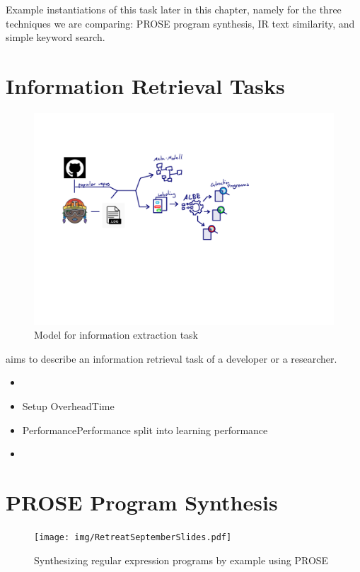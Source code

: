 \documentclass[\myrootdir/main.tex]{subfiles}
\begin{document}
Example instantiations of this task later in this chapter, namely for the three techniques we are comparing: PROSE program synthesis, IR text similarity, and simple keyword search. 

\section{Information Retrieval Tasks}
\begin{figure}[h]
	\centering
	\includegraphics[page=4, width=\textwidth, trim={0.5cm 0.5cm 0.5cm 0.5cm}, clip]{img/flow-of-research.pdf}
	\caption{Model for information extraction task}
	\label{fig:modelt-ie-task}
\end{figure}
aims to describe an information retrieval task of a developer or a researcher.
\begin{itemize}
	\item {}
	\item{Setup Overhead}{Time}
	\item{Performance}{Performance} split into learning performance
	\item 
\end{itemize}


\section{PROSE Program Synthesis}
\begin{figure}[h]
  \centering
\texttt{[image: img/RetreatSeptemberSlides.pdf]}
  \caption{Synthesizing regular expression programs by example using PROSE}
  \label{fig:prose-explanation}
\end{figure}
\end{document}
